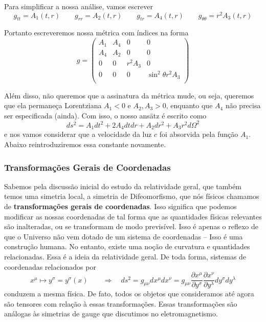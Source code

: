 \documentclass[11pt]{article}
\begin{document}
    Para simplificar a nossa análise, vamos escrever
\[ \tag{3.13} g_{tt} = A_1(t,r)\qquad g_{rr} = A_2(t,r) \qquad g_{tr} = A_4(t,r) \qquad g_{\theta \theta} = r^2 A_3(t,r)\]

Portanto escreveremos nossa métrica com índices na forma
\[ \tag{3.14} g = 
\begin{pmatrix}
A_1 & A_4& 0 & 0 \\
A_4 & A_2 & 0 & 0 \\
0 & 0 & r^2 A_3  & 0 \\
0 & 0 & 0 & \sin^2\theta r^2 A_3 \\
\end{pmatrix} \]

Além disso, não queremos que a assinatura da métrica mude, ou seja,
queremos que ela permaneça Lorentziana \(A_1<0\) e \(A_2, A_3>0\),
enquanto que \(A_4\) não precisa ser especificada (ainda). Com isso, o
nosso ansätz é escrito como
\[ \tag{3.15} ds^2 = A_1 dt^2 + 2 A_4 dt dr + A_2 dr^2 + A_3 r^2 d \Omega^2  \]
e nos vamos considerar que a velocidade da luz \(c\) foi absorvida pela
função \(A_1\). Abaixo reintroduziremos essa constante novamente.

    \hypertarget{transformauxe7uxf5es-gerais-de-coordenadas}{%
\subsubsection{Transformações Gerais de
Coordenadas}\label{transformauxe7uxf5es-gerais-de-coordenadas}}

    Sabemos pela discussão inicial do estudo da relatividade geral, que
também temos uma simetria local, a simetria de Difeomorfismo, que nós
físicos chamamos de \textbf{transformações gerais de coordenadas}. Isso
significa que podemos modificar as nossas coordenadas de tal forma que
as quantidades físicas relevantes são inalteradas, ou se transformam de
modo previsível. Isso é apenas o reflexo de que o Universo não vem
dotado de um sistema de coordenadas -- Isso é uma construção humana. No
entanto, existe uma noção de curvatura e quantidades relacionadas. Essa
é a ideia da relatividade geral. De toda forma, sistemas de coordenadas
relacionados por
\[ \tag{3.16} x^\mu \mapsto y^\sigma = y^\sigma(x) \qquad \Rightarrow \quad ds^2 = g_{\mu\nu} dx^\mu dx^\nu = g_{\mu\nu} \frac{\partial x^\mu}{\partial y^\sigma} \frac{\partial x^\nu}{\partial y^\lambda} dy^\sigma dy^\lambda \]
conduzem a mesma física. De fato, todos os objetos que consideramos até
agora são tensores com relação à essas transformações. Essas
transformações são análogas às simetrias de gauge que discutimos no
eletromagnetismo.
\end{document}
